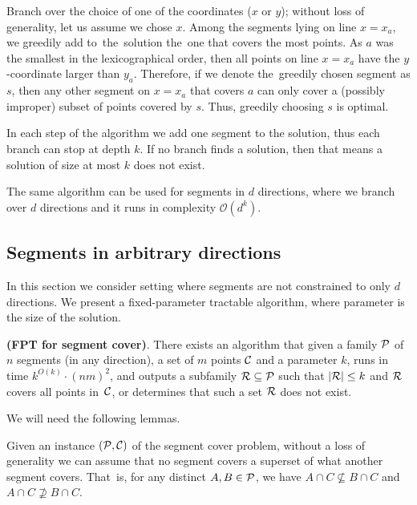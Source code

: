 Branch over the choice of one of the coordinates ($x$ or $y$);
without loss of generality, let us assume we chose $x$.
Among the segments lying on line $x = x_a$,
we greedily add to~the~solution the~one that covers the most points.
As $a$ was the smallest in the lexicographical order,
then all points on line $x = x_a$ have the $y$-coordinate larger than $y_a$.
Therefore, if we denote the~greedily chosen segment as $s$,
then any other segment on $x = x_a$ that covers $a$ can only
cover a (possibly improper) subset of points covered by $s$.
Thus, greedily choosing $s$ is optimal.

In each step of the algorithm we add one segment to the solution,
thus each branch can stop at depth $k$.
If no branch finds a solution, then that means a solution of size at most $k$ does not exist.


\begin{remark}
The same algorithm can be used for segments in $d$ directions,
where we branch over $d$ directions and it runs in complexity $\mathcal{O}(d^k)$.
\end{remark}

\subsection{Segments in arbitrary directions}
\label{segments_in_arbitrary_direction}
In this section we consider setting where segments are not constrained
to only $d$ directions. 
We present a fixed-parameter tractable algorithm,
where parameter is the size of the solution.

\begin{tw}{
	\label{segment_cover_fpt}
	\textbf{(FPT for segment cover)}.
	There exists an algorithm that given a family $\mathcal{P}$ of
	$n$ segments (in any direction),
	a set of $m$ points $\mathcal{C}$
	and a parameter $k$,
	runs in time $k^{O(k)} \cdot (nm)^2$,
	and outputs a subfamily $\mathcal{R} \subseteq \mathcal{P}$
	such that $|\mathcal{R}| \le k$ and $\mathcal{R}$ covers all points in~$\mathcal{C}$,
	or determines that such a set $\mathcal{R}$ does not exist.
}\end{tw}

We will need the following lemmas.

\begin{lemma}
   \label{fpt_reduction}
   Given an instance $(\mathcal{P}, \mathcal{C})$ of the segment cover problem,
   without a loss of generality we can assume that
   no segment covers a superset of what another segment covers.
   That~is, for any distinct $A, B \in \mathcal{P}$, we have
   $A \cap C \not \subseteq B \cap C$ and $A \cap C \not \supseteq B \cap C$.
\end{lemma}   
   

